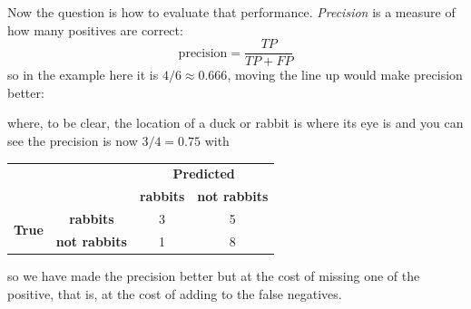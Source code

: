 \documentclass[12pt]{article}
\begin{document}
Now the question is how to evaluate that
performance. \textsl{Precision} is a measure of how many positives are
correct:
\begin{equation}
  \mbox{precision}=\frac{TP}{TP+FP}
\end{equation}
so in the example here it is $4/6\approx0.666$, moving the line up would make precision better:
\begin{center}

\end{center}
where, to be clear, the location of a duck or rabbit is where its eye is and you can see the precision is now $3/4=0.75$ with
\begin{center}
\begin{tabular}{|c|c|c|c|}
\cline{3-4}
\multicolumn{1}{c}{}&\multicolumn{1}{c|}{}&\multicolumn{2}{c|}{\textbf{Predicted}} \\ \cline{3-4} 
\multicolumn{1}{c}{}&\multicolumn{1}{c|}{}& \textbf{rabbits} & \textbf{not rabbits} \\ \hline
\multirow{2}{*}{\textbf{True}}&
\textbf{rabbits} & 3 & 5 \\ \cline{2-4}
&\textbf{not rabbits} & 1 & 8 \\ \cline{1-4}
\end{tabular}
\end{center}
so we have made the precision better but at the cost of missing one of
the positive, that is, at the cost of adding to the false negatives.
\end{document}
